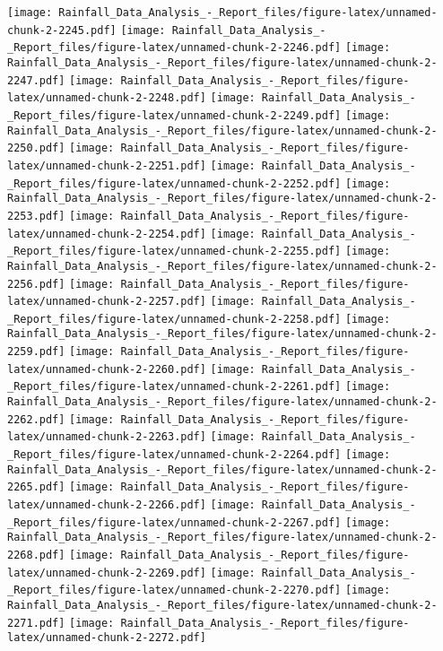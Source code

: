 \documentclass[
]{article}
\begin{document}
\texttt{[image: Rainfall\_Data\_Analysis\_-\_Report\_files/figure-latex/unnamed-chunk-2-2245.pdf]}
\texttt{[image: Rainfall\_Data\_Analysis\_-\_Report\_files/figure-latex/unnamed-chunk-2-2246.pdf]}
\texttt{[image: Rainfall\_Data\_Analysis\_-\_Report\_files/figure-latex/unnamed-chunk-2-2247.pdf]}
\texttt{[image: Rainfall\_Data\_Analysis\_-\_Report\_files/figure-latex/unnamed-chunk-2-2248.pdf]}
\texttt{[image: Rainfall\_Data\_Analysis\_-\_Report\_files/figure-latex/unnamed-chunk-2-2249.pdf]}
\texttt{[image: Rainfall\_Data\_Analysis\_-\_Report\_files/figure-latex/unnamed-chunk-2-2250.pdf]}
\texttt{[image: Rainfall\_Data\_Analysis\_-\_Report\_files/figure-latex/unnamed-chunk-2-2251.pdf]}
\texttt{[image: Rainfall\_Data\_Analysis\_-\_Report\_files/figure-latex/unnamed-chunk-2-2252.pdf]}
\texttt{[image: Rainfall\_Data\_Analysis\_-\_Report\_files/figure-latex/unnamed-chunk-2-2253.pdf]}
\texttt{[image: Rainfall\_Data\_Analysis\_-\_Report\_files/figure-latex/unnamed-chunk-2-2254.pdf]}
\texttt{[image: Rainfall\_Data\_Analysis\_-\_Report\_files/figure-latex/unnamed-chunk-2-2255.pdf]}
\texttt{[image: Rainfall\_Data\_Analysis\_-\_Report\_files/figure-latex/unnamed-chunk-2-2256.pdf]}
\texttt{[image: Rainfall\_Data\_Analysis\_-\_Report\_files/figure-latex/unnamed-chunk-2-2257.pdf]}
\texttt{[image: Rainfall\_Data\_Analysis\_-\_Report\_files/figure-latex/unnamed-chunk-2-2258.pdf]}
\texttt{[image: Rainfall\_Data\_Analysis\_-\_Report\_files/figure-latex/unnamed-chunk-2-2259.pdf]}
\texttt{[image: Rainfall\_Data\_Analysis\_-\_Report\_files/figure-latex/unnamed-chunk-2-2260.pdf]}
\texttt{[image: Rainfall\_Data\_Analysis\_-\_Report\_files/figure-latex/unnamed-chunk-2-2261.pdf]}
\texttt{[image: Rainfall\_Data\_Analysis\_-\_Report\_files/figure-latex/unnamed-chunk-2-2262.pdf]}
\texttt{[image: Rainfall\_Data\_Analysis\_-\_Report\_files/figure-latex/unnamed-chunk-2-2263.pdf]}
\texttt{[image: Rainfall\_Data\_Analysis\_-\_Report\_files/figure-latex/unnamed-chunk-2-2264.pdf]}
\texttt{[image: Rainfall\_Data\_Analysis\_-\_Report\_files/figure-latex/unnamed-chunk-2-2265.pdf]}
\texttt{[image: Rainfall\_Data\_Analysis\_-\_Report\_files/figure-latex/unnamed-chunk-2-2266.pdf]}
\texttt{[image: Rainfall\_Data\_Analysis\_-\_Report\_files/figure-latex/unnamed-chunk-2-2267.pdf]}
\texttt{[image: Rainfall\_Data\_Analysis\_-\_Report\_files/figure-latex/unnamed-chunk-2-2268.pdf]}
\texttt{[image: Rainfall\_Data\_Analysis\_-\_Report\_files/figure-latex/unnamed-chunk-2-2269.pdf]}
\texttt{[image: Rainfall\_Data\_Analysis\_-\_Report\_files/figure-latex/unnamed-chunk-2-2270.pdf]}
\texttt{[image: Rainfall\_Data\_Analysis\_-\_Report\_files/figure-latex/unnamed-chunk-2-2271.pdf]}
\texttt{[image: Rainfall\_Data\_Analysis\_-\_Report\_files/figure-latex/unnamed-chunk-2-2272.pdf]}
\end{document}
